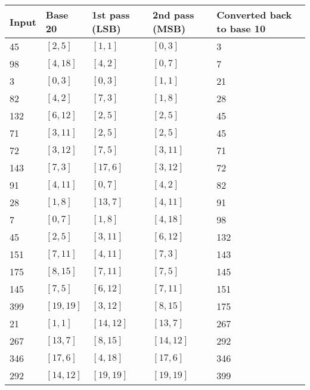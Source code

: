 \documentclass[11pt]{article}
\begin{document}
\bigskip

\begin{center}
\begin{tabular}{|p{6em}|p{6em}|p{6em}|p{6em}|p{6em}|}
\hline
\textbf{Input} & \textbf{Base 20} & \textbf{1st pass (LSB)} & \textbf{2nd pass (MSB)} & \textbf{Converted back to base 10}\\
\hline
45   & $[2,5]$     & $[1,1]$   & $[0,3]$    & 3   \\
\hline
98   & $[4,18]$    & $[4,2]$   & $[0,7]$    & 7   \\
\hline
3    & $[0,3]$     & $[0,3]$   & $[1,1]$    & 21  \\
\hline
82   & $[4,2]$     & $[7,3]$   & $[1,8]$    & 28  \\
\hline
132  & $[6,12]$    & $[2,5]$   & $[2,5]$    & 45  \\
\hline
71   & $[3,11]$    & $[2,5]$   & $[2,5]$    & 45  \\
\hline
72   & $[3,12]$    & $[7,5]$   & $[3,11]$   & 71  \\
\hline
143  & $[7,3]$     & $[17,6]$  & $[3,12]$   & 72  \\
\hline
91   & $[4,11]$    & $[0,7]$   & $[4,2]$    & 82  \\
\hline
28   & $[1,8]$     & $[13,7]$  & $[4,11]$   & 91  \\
\hline
7    & $[0,7]$     & $[1,8]$   & $[4,18]$   & 98  \\
\hline
45   & $[2,5]$     & $[3,11]$  & $[6,12]$   & 132 \\
\hline
151  & $[7,11]$    & $[4,11]$  & $[7,3]$    & 143 \\
\hline
175  & $[8,15]$    & $[7,11]$  & $[7,5]$    & 145 \\
\hline
145  & $[7,5]$     & $[6,12]$  & $[7,11]$   & 151 \\
\hline
399  & $[19,19]$   & $[3,12]$  & $[8,15]$   & 175 \\
\hline
21   & $[1,1]$     & $[14,12]$ & $[13,7]$   & 267 \\
\hline
267  & $[13,7]$    & $[8,15]$  & $[14,12]$  & 292 \\
\hline
346  & $[17,6]$    & $[4,18]$  & $[17,6]$   & 346 \\
\hline
292  & $[14,12]$   & $[19,19]$ & $[19,19]$  & 399 \\
\hline
\end{tabular}
\end{center}


\newpage
\end{document}
